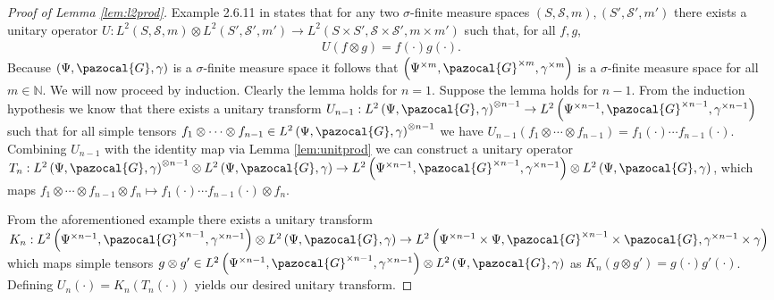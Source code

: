 \documentclass[aos,preprint]{imsart}
\def\sG{\pazocal{G}}
\theoremstyle{plain}
\theoremstyle{defintion}
\begin{document}
	\begin{proof}[Proof of Lemma \ref{lem:l2prod}]
		Example 2.6.11 in \cite{kadison83} states that for any two $\sigma$-finite measure spaces $\left( S,\mathscr{S}, m \right), \left( S',\mathscr{S}', m' \right)$ there exists a unitary operator $U: L^2\left( S,\mathscr{S}, m \right) \otimes L^2 \left( S',\mathscr{S'}, m' \right) \to L^2\left( S\times S', \mathscr{S}\times \mathscr{S'}, m\times m' \right)$ such that, for all $f,g$,
		\begin{eqnarray*}
			U(f\otimes g) = f(\cdot)g(\cdot).
		\end{eqnarray*}
		Because $\left( \Psi, \sG, \gamma \right)$ is a $\sigma$-finite measure space it follows that $\left( \Psi^{\times m}, \sG^{\times m}, \gamma^{\times m} \right)$ is a $\sigma$-finite measure space for all $m\in \mathbb{N}$. We will now proceed by induction. Clearly the lemma holds for $n=1$. Suppose the lemma holds for $n-1$. From the induction hypothesis we know that there exists a unitary transform $U_{n-1}: L^2\left( \Psi, \sG, \gamma \right)^{\otimes n-1} \to L^2 \left( \Psi^{\times n-1} ,\sG ^{\times n-1}  , \gamma^{\times n-1} \right)$ such that for all simple tensors $f_1\otimes\cdots \otimes f_{n-1} \in L^2\left( \Psi, \sG, \gamma \right)^{\otimes n-1}$ we have $U_{n-1}\left( f_1\otimes\cdots \otimes f_{n-1} \right) = f_1(\cdot)\cdots f_{n-1}\left( \cdot \right)$. Combining $U_{n-1}$ with the identity map via Lemma \ref{lem:unitprod} we can construct a unitary operator $T_n: L^2\left( \Psi, \sG, \gamma \right)^{\otimes n-1} \otimes L^2\left( \Psi, \sG, \gamma \right) \to L^2 \left( \Psi^{\times n-1} ,\sG ^{\times n-1}  , \gamma^{\times n-1} \right) \otimes L^2\left( \Psi, \sG, \gamma \right)$, which maps $f_1\otimes\cdots\otimes f_{n-1}  \otimes f_n \mapsto f_1(\cdot)\cdots f_{n-1}(\cdot) \otimes f_n$.

		From the aforementioned example there exists a unitary transform $K_n:L^2\left( \Psi^{\times n-1},\sG^{\times n-1}, \gamma^{\times n-1} \right)\otimes L^2\left( \Psi,\sG, \gamma \right)\to L^2 \left( \Psi^{\times n-1} \times \Psi,\sG ^{\times n-1} \times \sG , \gamma^{\times n-1}\times \gamma\right)$ which maps simple tensors $g\otimes g' \in L^2\left( \Psi^{\times n-1},\sG^{\times n-1}, \gamma^{\times n-1} \right)\otimes L^2\left( \Psi,\sG, \gamma \right)$ as $K_n\left( g\otimes g' \right) = g(\cdot) g'(\cdot)$. Defining $U_n(\cdot)= K_n\left( T_n \left( \cdot \right) \right)$ yields our desired unitary transform.
	\end{proof}
\end{document}
